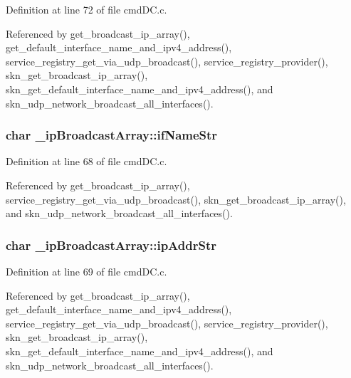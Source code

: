 Definition at line 72 of file cmd\+D\+C.\+c.



Referenced by get\+\_\+broadcast\+\_\+ip\+\_\+array(), get\+\_\+default\+\_\+interface\+\_\+name\+\_\+and\+\_\+ipv4\+\_\+address(), service\+\_\+registry\+\_\+get\+\_\+via\+\_\+udp\+\_\+broadcast(), service\+\_\+registry\+\_\+provider(), skn\+\_\+get\+\_\+broadcast\+\_\+ip\+\_\+array(), skn\+\_\+get\+\_\+default\+\_\+interface\+\_\+name\+\_\+and\+\_\+ipv4\+\_\+address(), and skn\+\_\+udp\+\_\+network\+\_\+broadcast\+\_\+all\+\_\+interfaces().

\hypertarget{struct__ip_broadcast_array_a193b90f271c061e8bf1593bab6a182c9}{}
\subsubsection[{if\+Name\+Str}]{\setlength{\rightskip}{0pt plus 5cm}char \+\_\+ip\+Broadcast\+Array\+::if\+Name\+Str}\label{struct__ip_broadcast_array_a193b90f271c061e8bf1593bab6a182c9}


Definition at line 68 of file cmd\+D\+C.\+c.



Referenced by get\+\_\+broadcast\+\_\+ip\+\_\+array(), service\+\_\+registry\+\_\+get\+\_\+via\+\_\+udp\+\_\+broadcast(), skn\+\_\+get\+\_\+broadcast\+\_\+ip\+\_\+array(), and skn\+\_\+udp\+\_\+network\+\_\+broadcast\+\_\+all\+\_\+interfaces().

\hypertarget{struct__ip_broadcast_array_a96891ccc707337890b2a166e3ef3a8e1}{}
\subsubsection[{ip\+Addr\+Str}]{\setlength{\rightskip}{0pt plus 5cm}char \+\_\+ip\+Broadcast\+Array\+::ip\+Addr\+Str}\label{struct__ip_broadcast_array_a96891ccc707337890b2a166e3ef3a8e1}


Definition at line 69 of file cmd\+D\+C.\+c.



Referenced by get\+\_\+broadcast\+\_\+ip\+\_\+array(), get\+\_\+default\+\_\+interface\+\_\+name\+\_\+and\+\_\+ipv4\+\_\+address(), service\+\_\+registry\+\_\+get\+\_\+via\+\_\+udp\+\_\+broadcast(), service\+\_\+registry\+\_\+provider(), skn\+\_\+get\+\_\+broadcast\+\_\+ip\+\_\+array(), skn\+\_\+get\+\_\+default\+\_\+interface\+\_\+name\+\_\+and\+\_\+ipv4\+\_\+address(), and skn\+\_\+udp\+\_\+network\+\_\+broadcast\+\_\+all\+\_\+interfaces().

